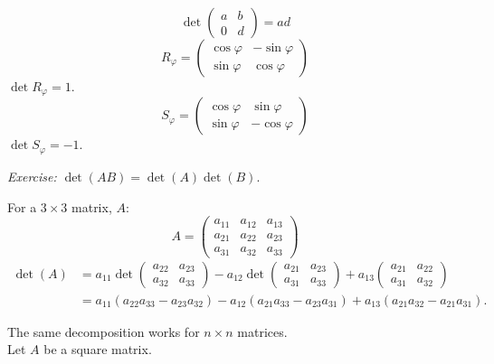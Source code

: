 \documentclass[10pt]{scrartcl}
\begin{document}
\begin{examples}
	\[
  \det\begin{pmatrix}
	a & b\\ 0 & d
\end{pmatrix} = ad
\]
\[
  R_\varphi = \begin{pmatrix}
 \cos\varphi & -\sin\varphi\\
 \sin\varphi & \cos\varphi 	
 \end{pmatrix}
\]
$\det R_\varphi = 1$. 
\[
  S_\varphi = \begin{pmatrix}
 \cos\varphi & \sin\varphi\\
 \sin\varphi & -\cos\varphi 	
 \end{pmatrix}
\]
$\det S_\varphi = -1$. 
\end{examples}


\emph{Exercise:} $\det(AB)= \det(A)\det(B)$.

\vsp


\begin{definition} For a $3\times 3$ matrix, $A$:
\[
  A = \begin{pmatrix}
 a_{11} & a_{12} & a_{13}\\
 a_{21} & a_{22} & a_{23}\\
 a_{31} & a_{32} & a_{33}	
 \end{pmatrix}
\]
 \begin{align*}
  \det(A) &= a_{11}\det\begin{pmatrix}
a_{22} & a_{23}	\\ a_{32} & a_{33}
\end{pmatrix}
- a_{12}\det\begin{pmatrix}
a_{21} & a_{23} \\ a_{31} & a_{33}
\end{pmatrix}
+ a_{13}\begin{pmatrix}
a_{21} & a_{22} \\ a_{31} & a_{32}	
\end{pmatrix}\\
&= a_{11}(a_{22}a_{33} - a_{23}a_{32}) - a_{12}(a_{21}a_{33} - a_{23}a_{31}) + a_{13}(a_{21}a_{32} - a_{21}a_{31}).
\end{align*}
\end{definition}

The same decomposition works for $n \times n$ matrices.\\


Let $A$ be a square matrix.\\
\end{document}
